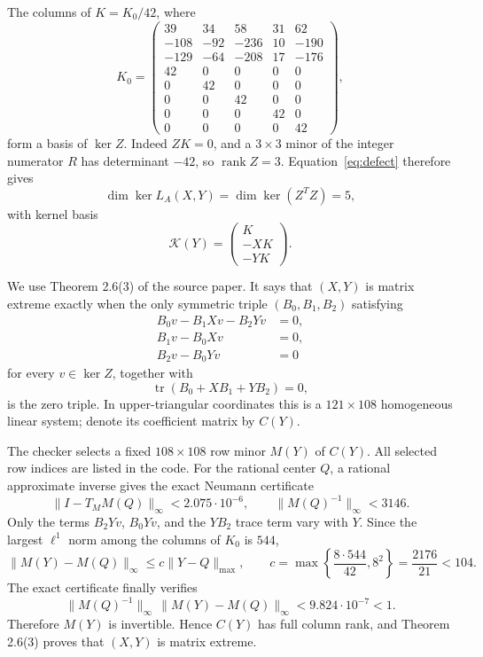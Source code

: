 \documentclass[11pt]{article}
\newcommand{\tr}{\operatorname{tr}}
\newcommand{\normmax}[1]{\lVert #1\rVert_{\max}}
\begin{document}
The columns of $K=K_0/42$, where
\[
K_0=\begin{pmatrix}
39&34&58&31&62\\
-108&-92&-236&10&-190\\
-129&-64&-208&17&-176\\
42&0&0&0&0\\
0&42&0&0&0\\
0&0&42&0&0\\
0&0&0&42&0\\
0&0&0&0&42
\end{pmatrix},
\]
form a basis of $\ker Z$.  Indeed $ZK=0$, and a $3\times3$ minor of the
integer numerator $R$ has determinant $-42$, so $\operatorname{rank}Z=3$.
Equation~\eqref{eq:defect} therefore gives
\[
 \dim\ker L_A(X,Y)=\dim\ker(Z^TZ)=5,
\]
with kernel basis
\[
 \mathcal K(Y)=\begin{pmatrix}K\\-XK\\-YK\end{pmatrix}.
\]

We use Theorem 2.6(3) of the source paper.  It says that $(X,Y)$ is matrix
extreme exactly when the only symmetric triple $(B_0,B_1,B_2)$ satisfying
\begin{align}
 B_0v-B_1Xv-B_2Yv&=0,\label{eq:m1}\\
 B_1v-B_0Xv&=0,\label{eq:m2}\\
 B_2v-B_0Yv&=0\label{eq:m3}
\end{align}
for every $v\in\ker Z$, together with
\begin{equation}\label{eq:trace}
 \tr(B_0+XB_1+YB_2)=0,
\end{equation}
is the zero triple.  In upper-triangular coordinates this is a
$121\times108$ homogeneous linear system; denote its coefficient matrix by
$C(Y)$.

The checker selects a fixed $108\times108$ row minor $M(Y)$ of $C(Y)$.  All
selected row indices are listed in the code.  For the rational center $Q$, a
rational approximate inverse gives the exact Neumann certificate
\[
 \lVert I-T_M M(Q)\rVert_\infty<2.075\cdot10^{-6},
 \qquad \lVert M(Q)^{-1}\rVert_\infty<3146.
\]
Only the terms $B_2Yv$, $B_0Yv$, and the $YB_2$ trace term vary with $Y$.
Since the largest $\ell^1$ norm among the columns of $K_0$ is $544$,
\[
 \lVert M(Y)-M(Q)\rVert_\infty
 \le c\normmax{Y-Q},\qquad
 c=\max\left\{\frac{8\cdot544}{42},8^2\right\}
 =\frac{2176}{21}<104.
\]
The exact certificate finally verifies
\[
 \lVert M(Q)^{-1}\rVert_\infty\,
 \lVert M(Y)-M(Q)\rVert_\infty
 <9.824\cdot10^{-7}<1.
\]
Therefore $M(Y)$ is invertible.  Hence $C(Y)$ has full column rank, and
Theorem 2.6(3) proves that $(X,Y)$ is matrix extreme.
\end{document}
